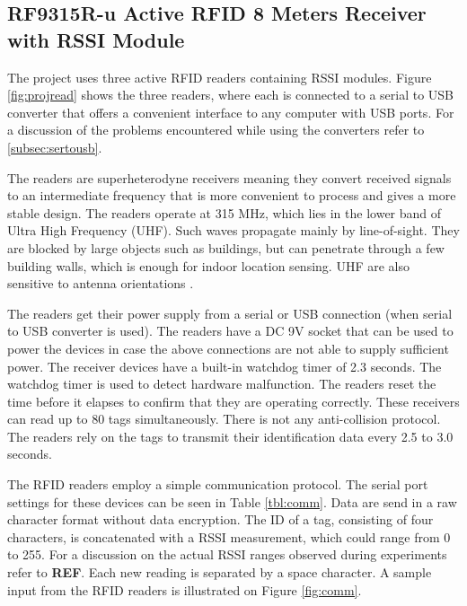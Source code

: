 \subsection{RF9315R-u Active RFID 8 Meters Receiver with RSSI Module}
\label{subsec:receiver}

The project uses three active RFID readers containing RSSI modules. Figure \ref{fig:projread} shows the three readers, where each is connected to a serial to USB converter that offers a convenient interface to any computer with USB ports. For a discussion of the problems encountered while using the converters refer to \ref{subsec:sertousb}. 

The readers are superheterodyne receivers meaning they convert received signals to an intermediate frequency that is more convenient to process and gives a more stable design. The readers operate at 315 MHz, which lies in the lower band of Ultra High Frequency (UHF). Such waves propagate mainly by line-of-sight. They are blocked by large objects such as buildings, but can penetrate through a few building walls, which is enough for indoor location sensing. UHF are also sensitive to antenna orientations \cite[p. 15]{Hunt2007}.

The readers get their power supply from a serial or USB connection (when serial to USB converter is used). The readers have a DC 9V socket that can be used to power the devices in case the above connections are not able to supply sufficient power. The receiver devices have a built-in watchdog timer of 2.3 seconds. The watchdog timer is used to detect hardware malfunction. The readers reset the time before it elapses to confirm that they are operating correctly. These receivers can read up to 80 tags simultaneously. There is not any anti-collision protocol. The readers rely on the tags to transmit their identification data every 2.5 to 3.0 seconds.

The RFID readers employ a simple communication protocol. The serial port settings for these devices can be seen in Table \ref{tbl:comm}. Data are send in a raw character format without data encryption. The ID of a tag, consisting of four characters, is concatenated with a RSSI measurement, which could range from 0 to 255. For a discussion on the actual RSSI ranges observed during experiments refer to \textbf{REF}. Each new reading is separated by a space character. A sample input from the RFID readers is illustrated on Figure \ref{fig:comm}. 

